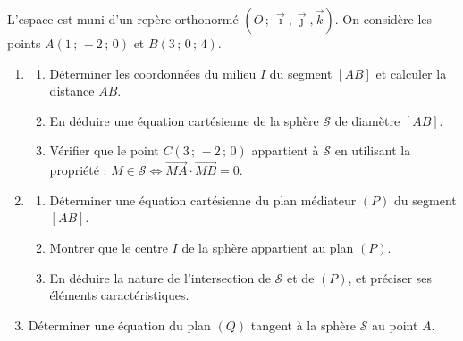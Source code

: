 \documentclass[11pt]{article}
\begin{document}
\begin{exercice}
L'espace est muni d'un repère orthonormé $(O\,;\,\vec{\imath},\vec{\jmath},\vec{k})$. On considère les points $A(1\,;\,-2\,;\,0)$ et $B(3\,;\,0\,;\,4)$.
\begin{enumerate}
\item 
\begin{enumerate}
\item Déterminer les coordonnées du milieu $I$ du segment $[AB]$ et calculer la distance $AB$.
\item En déduire une équation cartésienne de la sphère $\mathcal{S}$ de diamètre $[AB]$.
\item Vérifier que le point $C(3\,;\,-2\,;\,0)$ appartient à $\mathcal{S}$ en utilisant la propriété : $M\in\mathcal{S} \iff \overrightarrow{MA}\cdot\overrightarrow{MB}=0$.
\end{enumerate}
\item 
\begin{enumerate}
\item Déterminer une équation cartésienne du plan médiateur $(P)$ du segment $[AB]$.
\item Montrer que le centre $I$ de la sphère appartient au plan $(P)$.
\item En déduire la nature de l'intersection de $\mathcal{S}$ et de $(P)$, et préciser ses éléments caractéristiques.
\end{enumerate}
\item Déterminer une équation du plan $(Q)$ tangent à la sphère $\mathcal{S}$ au point $A$.
\end{enumerate}
\end{exercice}
\end{document}
